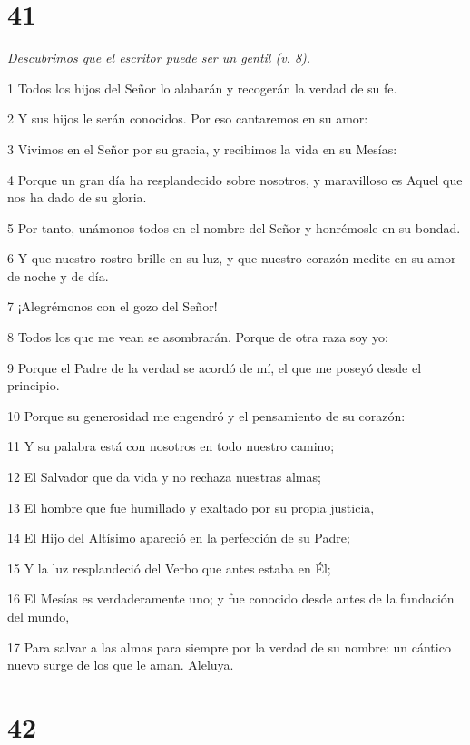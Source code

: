 \chapter{41}

\par \textit{Descubrimos que el escritor puede ser un gentil (v. 8).}

\par 1 Todos los hijos del Señor lo alabarán y recogerán la verdad de su fe.
\par 2 Y sus hijos le serán conocidos. Por eso cantaremos en su amor:
\par 3 Vivimos en el Señor por su gracia, y recibimos la vida en su Mesías:
\par 4 Porque un gran día ha resplandecido sobre nosotros, y maravilloso es Aquel que nos ha dado de su gloria.
\par 5 Por tanto, unámonos todos en el nombre del Señor y honrémosle en su bondad.
\par 6 Y que nuestro rostro brille en su luz, y que nuestro corazón medite en su amor de noche y de día.
\par 7 ¡Alegrémonos con el gozo del Señor!
\par 8 Todos los que me vean se asombrarán. Porque de otra raza soy yo:
\par 9 Porque el Padre de la verdad se acordó de mí, el que me poseyó desde el principio.
\par 10 Porque su generosidad me engendró y el pensamiento de su corazón:
\par 11 Y su palabra está con nosotros en todo nuestro camino;
\par 12 El Salvador que da vida y no rechaza nuestras almas;
\par 13 El hombre que fue humillado y exaltado por su propia justicia,
\par 14 El Hijo del Altísimo apareció en la perfección de su Padre;
\par 15 Y la luz resplandeció del Verbo que antes estaba en Él;
\par 16 El Mesías es verdaderamente uno; y fue conocido desde antes de la fundación del mundo,
\par 17 Para salvar a las almas para siempre por la verdad de su nombre: un cántico nuevo surge de los que le aman. Aleluya.

\chapter{42}

